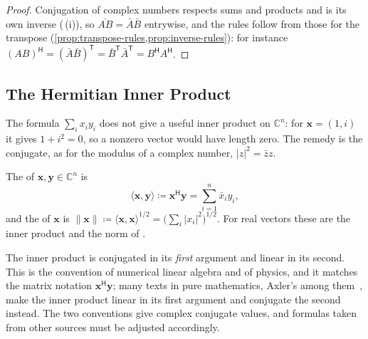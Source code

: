 \begin{proof}
Conjugation of complex numbers respects sums and products and is its own inverse (\,(i)), so $\overline{AB}=\bar A\bar B$ entrywise, and the rules follow from those for the transpose (\cref{prop:transpose-rules,prop:inverse-rules}): for instance $(AB)^{\mathsf H}=(\bar A\bar B)^{\mathsf T}=\bar B^{\mathsf T}\bar A^{\mathsf T}=B^{\mathsf H}A^{\mathsf H}$.
\end{proof}

\subsection{The Hermitian Inner Product}

The formula $\sum_ix_iy_i$ does not give a useful inner product on $\mathbb C^n$: for $\mathbf x=(1,i)$ it gives $1+i^2=0$, so a nonzero vector would have length zero. The remedy is the conjugate, as for the modulus of a complex number, $|z|^2=\bar zz$.

\begin{definition}
\label{def:hermitian-inner-product}
The  of $\mathbf x,\mathbf y\in\mathbb C^n$ is
\[
\langle\mathbf x,\mathbf y\rangle\coloneqq\mathbf x^{\mathsf H}\mathbf y=\sum_{i=1}^n\bar x_iy_i ,
\]
and the  of $\mathbf x$ is $\|\mathbf x\|\coloneqq\langle\mathbf x,\mathbf x\rangle^{1/2}=\bigl(\sum_i|x_i|^2\bigr)^{1/2}$. For real vectors these are the inner product and the norm of .
\end{definition}

The inner product is conjugated in its \emph{first} argument and linear in its second. This is the convention of numerical linear algebra and of physics, and it matches the matrix notation $\mathbf x^{\mathsf H}\mathbf y$; many texts in pure mathematics, Axler's among them~\cite[Chap.~6]{axler2024}, make the inner product linear in its first argument and conjugate the second instead. The two conventions give complex conjugate values, and formulas taken from other sources must be adjusted accordingly.

